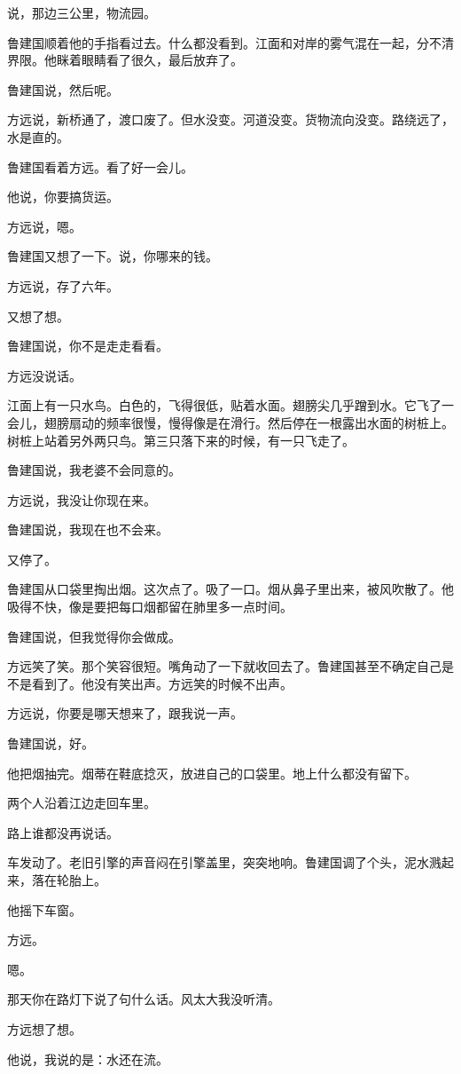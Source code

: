 \documentclass[UTF8,a5paper,11pt,openany]{ctexbook}
\begin{document}
说，那边三公里，物流园。

鲁建国顺着他的手指看过去。什么都没看到。江面和对岸的雾气混在一起，分不清界限。他眯着眼睛看了很久，最后放弃了。

鲁建国说，然后呢。

方远说，新桥通了，渡口废了。但水没变。河道没变。货物流向没变。路绕远了，水是直的。

鲁建国看着方远。看了好一会儿。

他说，你要搞货运。

方远说，嗯。

鲁建国又想了一下。说，你哪来的钱。

方远说，存了六年。

又想了想。

鲁建国说，你不是走走看看。

方远没说话。

江面上有一只水鸟。白色的，飞得很低，贴着水面。翅膀尖几乎蹭到水。它飞了一会儿，翅膀扇动的频率很慢，慢得像是在滑行。然后停在一根露出水面的树桩上。树桩上站着另外两只鸟。第三只落下来的时候，有一只飞走了。

鲁建国说，我老婆不会同意的。

方远说，我没让你现在来。

鲁建国说，我现在也不会来。

又停了。

鲁建国从口袋里掏出烟。这次点了。吸了一口。烟从鼻子里出来，被风吹散了。他吸得不快，像是要把每口烟都留在肺里多一点时间。

鲁建国说，但我觉得你会做成。

方远笑了笑。那个笑容很短。嘴角动了一下就收回去了。鲁建国甚至不确定自己是不是看到了。他没有笑出声。方远笑的时候不出声。

方远说，你要是哪天想来了，跟我说一声。

鲁建国说，好。

他把烟抽完。烟蒂在鞋底捻灭，放进自己的口袋里。地上什么都没有留下。

两个人沿着江边走回车里。

路上谁都没再说话。

车发动了。老旧引擎的声音闷在引擎盖里，突突地响。鲁建国调了个头，泥水溅起来，落在轮胎上。

他摇下车窗。

方远。

嗯。

那天你在路灯下说了句什么话。风太大我没听清。

方远想了想。

他说，我说的是：水还在流。
\end{document}
